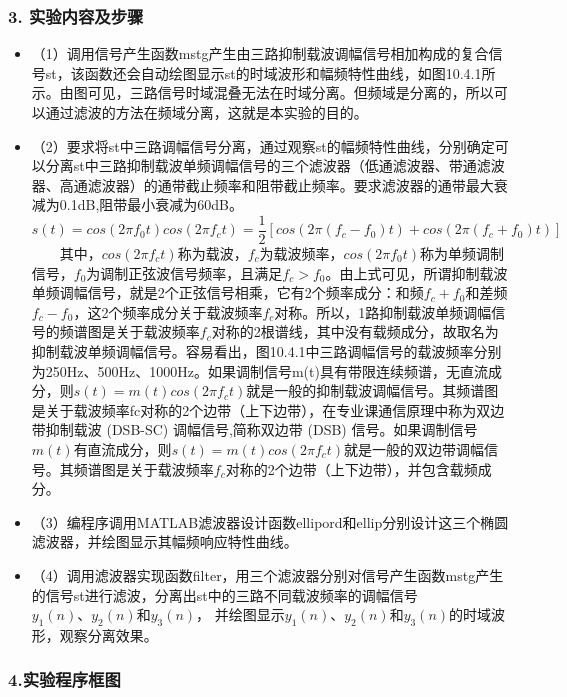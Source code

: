 \documentclass[11pt]{article}
\begin{document}
\subsubsection{3.
实验内容及步骤}\label{ux5b9eux9a8cux5185ux5bb9ux53caux6b65ux9aa4}

\begin{itemize}
\item
  （1）调用信号产生函数mstg产生由三路抑制载波调幅信号相加构成的复合信号st，该函数还会自动绘图显示st的时域波形和幅频特性曲线，如图10.4.1所示。由图可见，三路信号时域混叠无法在时域分离。但频域是分离的，所以可以通过滤波的方法在频域分离，这就是本实验的目的。
\item
  （2）要求将st中三路调幅信号分离，通过观察st的幅频特性曲线，分别确定可以分离st中三路抑制载波单频调幅信号的三个滤波器（低通滤波器、带通滤波器、高通滤波器）的通带截止频率和阻带截止频率。要求滤波器的通带最大衰减为0.1dB,阻带最小衰减为60dB。
  \[
  s(t)=cos(2\pi f_0 t)cos(2\pi f_c t)=\frac{1}{2}[cos(2\pi (f_c-f_0)t)+cos(2\pi (f_c+f_0)t)]
  \]
    其中，\(cos(2\pi f_c t)\)称为载波，\(f_c\)为载波频率，\(cos(2\pi f_0 t)\)称为单频调制信号，\(f_0\)为调制正弦波信号频率，且满足\(f_c>f_0\)。由上式可见，所谓抑制载波单频调幅信号，就是2个正弦信号相乘，它有2个频率成分：和频\(f_c+f_0\)和差频\(f_c-f_0\)，这2个频率成分关于载波频率\(f_c\)对称。所以，1路抑制载波单频调幅信号的频谱图是关于载波频率\(f_c\)对称的2根谱线，其中没有载频成分，故取名为抑制载波单频调幅信号。容易看出，图10.4.1中三路调幅信号的载波频率分别为250Hz、500Hz、1000Hz。如果调制信号m(t)具有带限连续频谱，无直流成分，则\(s(t)=m(t)cos(2\pi f_c t)\)就是一般的抑制载波调幅信号。其频谱图是关于载波频率fc对称的2个边带（上下边带），在专业课通信原理中称为双边带抑制载波
  (DSB-SC) 调幅信号,简称双边带 (DSB)
  信号。如果调制信号\(m(t)\)有直流成分，则\(s(t)=m(t)cos(2\pi f_c t)\)就是一般的双边带调幅信号。其频谱图是关于载波频率\(f_c\)对称的2个边带（上下边带），并包含载频成分。
\item
  （3）编程序调用MATLAB滤波器设计函数ellipord和ellip分别设计这三个椭圆滤波器，并绘图显示其幅频响应特性曲线。
\item
  （4）调用滤波器实现函数filter，用三个滤波器分别对信号产生函数mstg产生的信号st进行滤波，分离出st中的三路不同载波频率的调幅信号\(y_1(n)、y_2(n)和y_3(n)\)，
  并绘图显示\(y_1(n)、y_2(n)和y_3(n)\)的时域波形，观察分离效果。
\end{itemize}

\subsubsection{4.实验程序框图}\label{ux5b9eux9a8cux7a0bux5e8fux6846ux56fe}
\end{document}

